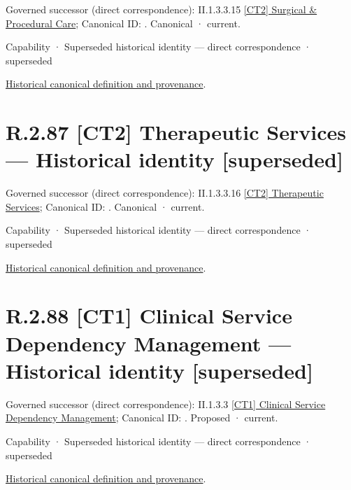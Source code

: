 {\small Governed successor (direct correspondence): II.1.3.3.15 \hyperref[element:c9a26d1aa1014545b9ae759b663c807b]{[CT2] Surgical \& Procedural Care}; Canonical ID: \texttt{}. Canonical · current.}\par
\label{element:8bc2a106165a4702b5f72fe46a206b69}
{\small Capability · Superseded historical identity — direct correspondence · superseded}\par
\href{../../../../../../../continuum/strategy/capability/8bc2a106165a4702b5f72fe46a206b69.md}{Historical canonical definition and provenance}.\par
\section*{R.2.87 [CT2] Therapeutic Services — Historical identity [superseded]}
\label{navigation:R.2.87}

{\small Governed successor (direct correspondence): II.1.3.3.16 \hyperref[element:b512b6d326004cb7b91a627fe6dbd8be]{[CT2] Therapeutic Services}; Canonical ID: \texttt{}. Canonical · current.}\par
\label{element:54032b52ee444bfe8b611fb9e8e2ba10}
{\small Capability · Superseded historical identity — direct correspondence · superseded}\par
\href{../../../../../../../continuum/strategy/capability/54032b52ee444bfe8b611fb9e8e2ba10.md}{Historical canonical definition and provenance}.\par
\section*{R.2.88 [CT1] Clinical Service Dependency Management — Historical identity [superseded]}
\label{navigation:R.2.88}

{\small Governed successor (direct correspondence): II.1.3.3 \hyperref[element:232db9b8b47c450cb0aa9acaf539c09d]{[CT1] Clinical Service Dependency Management}; Canonical ID: \texttt{}. Proposed · current.}\par
\label{element:984ee17123eb4f92b3e55e55d24459b8}
{\small Capability · Superseded historical identity — direct correspondence · superseded}\par
\href{../../../../../../../continuum/strategy/capability/984ee17123eb4f92b3e55e55d24459b8.md}{Historical canonical definition and provenance}.\par

